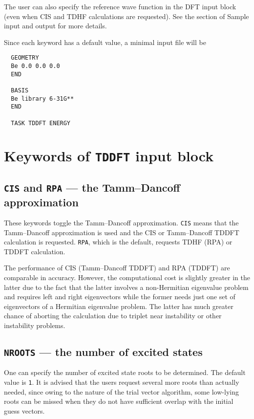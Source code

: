 The user can also specify the reference wave function in the DFT input block
(even when CIS and TDHF calculations are requested).  See the section of Sample
input and output for more details.

Since each keyword has a default value, a minimal input file will be
\begin{verbatim}
  GEOMETRY
  Be 0.0 0.0 0.0
  END

  BASIS
  Be library 6-31G**
  END

  TASK TDDFT ENERGY
\end{verbatim}

\section{Keywords of {\tt TDDFT} input block}

\subsection{{\tt CIS} and {\tt RPA} --- the Tamm--Dancoff approximation}

These keywords toggle the Tamm--Dancoff approximation.  \verb+CIS+ means
that the Tamm--Dancoff approximation is used and the CIS or Tamm--Dancoff TDDFT
calculation is requested.  \verb+RPA+, which is the default, requests 
TDHF (RPA) or TDDFT calculation.

The performance of CIS (Tamm--Dancoff TDDFT) and RPA (TDDFT) are comparable in
accuracy.  However, the computational cost is slightly greater in the latter due to
the fact that the latter involves a non-Hermitian eigenvalue problem and requires
left and right eigenvectors while the former needs just one set of eigenvectors of 
a Hermitian eigenvalue problem.  The latter has much greater chance of
aborting the calculation due to triplet near instability or other instability 
problems.

\subsection{{\tt NROOTS} --- the number of excited states}

One can specify the number of excited state roots to be determined.  The default 
value is \verb+1+.  It is advised that the users request several more roots than actually
needed, since owing to the nature of the trial vector algorithm, some low-lying
roots can be missed when they do not have sufficient overlap with the initial guess
vectors.

